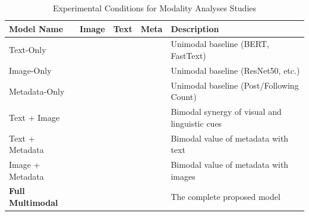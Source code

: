 \begin{table}[H]
	\centering
	\caption{Experimental Conditions for Modality Analyses Studies}
	\label{tab:ablation_conditions}
	\begin{tabularx}{\textwidth}{l c c c X} 
		\hline
		\textbf{Model Name} & \textbf{Image} & \textbf{Text} & \textbf{Meta} & \textbf{Description} \\ \hline
		Text-Only & & \checkmark & & Unimodal baseline (BERT, FastText) \\
		Image-Only & \checkmark & & & Unimodal baseline (ResNet50, etc.) \\
		Metadata-Only & & & \checkmark & Unimodal baseline (Post/Following Count) \\
		Text + Image & \checkmark & \checkmark & & Bimodal synergy of visual and linguistic cues \\
		Text + Metadata & & \checkmark & \checkmark & Bimodal value of metadata with text \\
		Image + Metadata & \checkmark & & \checkmark & Bimodal value of metadata with images \\
		\textbf{Full Multimodal} & \checkmark & \checkmark & \checkmark & The complete proposed model \\ \hline
	\end{tabularx}
\end{table}
